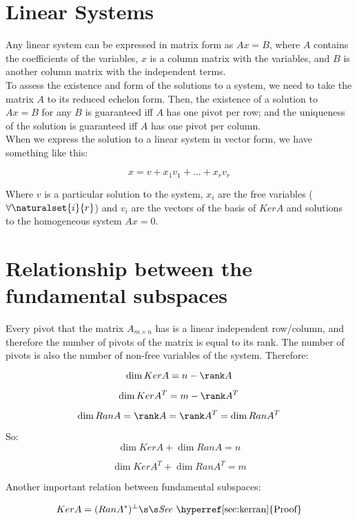\section*{Linear Systems}

Any linear system can be expressed in matrix form as $Ax=B$, where $A$ contains the coefficients of the variables, $x$ is a column matrix with the variables, and $B$ is another column matrix with the independent terms.\\

To assess the existence and form of the solutions to a system, we need to take the matrix $A$ to its reduced echelon form. Then, the existence of a solution to $Ax=B$ for any $B$ is guaranteed iff $A$ has one pivot per row; and the uniqueness of the solution is guaranteed iff $A$ has one pivot per column.\\

When we express the solution to a linear system in vector form, we have something like this:

$$x=v+x_1v_1+...+x_rv_r$$

Where $v$ is a particular solution to the system, $x_i$ are the free variables ($\forall \naturalset{i}{r}$) and $v_i$ are the vectors of the basis of $KerA$ and solutions to the homogeneous system $Ax=0$.

\section*{Relationship between the fundamental subspaces}

Every pivot that the matrix $A_{m \times n}$ has is a linear independent row/column, and therefore the number of pivots of the matrix is equal to its rank. The number of pivots is also the number of non-free variables of the system. Therefore:

$$\dim KerA=n-\rank A$$

$$\dim KerA^T=m-\rank A^T$$

$$\dim RanA=\rank A=\rank A^T=\dim RanA^T$$

So:
$$\dim KerA+\dim RanA=n$$

$$\dim KerA^T+\dim RanA^T=m$$

Another important relation between fundamental subspaces: 

$$KerA=(RanA^*)^\perp \s\s \text{\textit{See} \hyperref[sec:kerran]{Proof}}$$